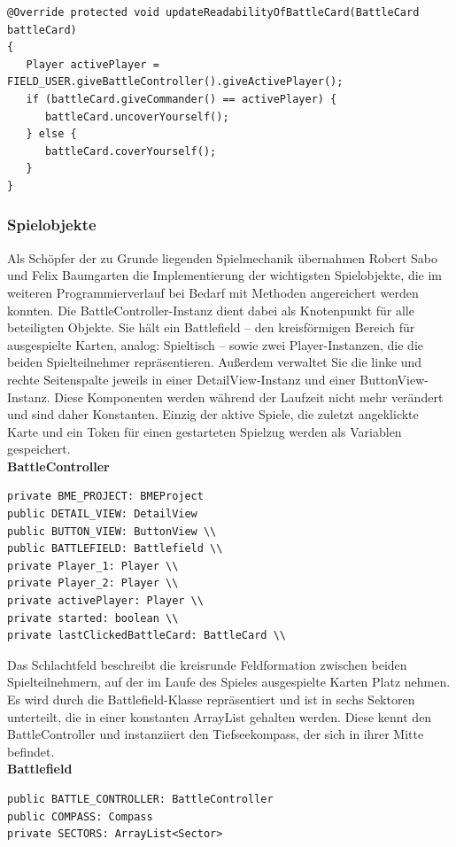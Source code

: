 \begin{lstlisting}
@Override protected void updateReadabilityOfBattleCard(BattleCard battleCard)
{
   Player activePlayer = FIELD_USER.giveBattleController().giveActivePlayer();
   if (battleCard.giveCommander() == activePlayer) {
      battleCard.uncoverYourself();
   } else {
      battleCard.coverYourself();
   }
}
\end{lstlisting}

\subsubsection{Spielobjekte}
Als Schöpfer der zu Grunde liegenden Spielmechanik übernahmen Robert Sabo und Felix Baumgarten die Implementierung der wichtigsten Spielobjekte, die im weiteren Programmierverlauf bei Bedarf mit Methoden angereichert werden konnten.
Die BattleController-Instanz dient dabei als Knotenpunkt für alle beteiligten Objekte. Sie hält ein Battlefield – den kreisförmigen Bereich für ausgespielte Karten, analog: Spieltisch – sowie zwei Player-Instanzen, die die beiden Spielteilnehmer repräsentieren. Außerdem verwaltet Sie die linke und rechte Seitenspalte jeweils in einer DetailView-Instanz und einer ButtonView-Instanz. Diese Komponenten werden während der Laufzeit nicht mehr verändert und sind daher Konstanten. Einzig der aktive Spiele, die zuletzt angeklickte Karte und ein Token für einen gestarteten Spielzug werden als Variablen gespeichert.
\\
\textbf{BattleController}
\begin{lstlisting}[frame=single]
private BME_PROJECT: BMEProject 
public DETAIL_VIEW: DetailView 
public BUTTON_VIEW: ButtonView \\
public BATTLEFIELD: Battlefield \\
private Player_1: Player \\
private Player_2: Player \\
private activePlayer: Player \\
private started: boolean \\
private lastClickedBattleCard: BattleCard \\
\end{lstlisting}

Das Schlachtfeld beschreibt die kreisrunde Feldformation zwischen beiden Spielteilnehmern, auf der im Laufe des Spieles ausgespielte Karten Platz nehmen. Es wird durch die Battlefield-Klasse repräsentiert und ist in sechs Sektoren unterteilt, die in einer konstanten ArrayList gehalten werden. Diese kennt den BattleController und instanziiert den Tiefseekompass, der sich in ihrer Mitte befindet.
\\
\textbf{Battlefield}
\begin{lstlisting}[frame=single]
public BATTLE_CONTROLLER: BattleController 
public COMPASS: Compass
private SECTORS: ArrayList<Sector>
\end{lstlisting}


